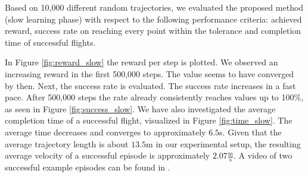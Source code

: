 \label{results}
Based on 10,000 different random trajectories, we evaluated the proposed method (slow learning phase) with respect to the following performance criteria: achieved reward, success rate on reaching every point within the tolerance and completion time of successful flights.

In Figure \ref{fig:reward_slow} the reward per step is plotted. We observed an increasing reward in the first 500,000 steps. The value seems to have converged by then.
Next, the success rate is evaluated. The success rate increases in a fast pace. After 500,000 steps the rate already consistently reaches values up to 100\%, as seen in Figure \ref{fig:success_slow}.
We have also investigated the average completion time of a successful flight, visualized in Figure \ref{fig:time_slow}. The average time decreases and converges to approximately $6.5$s. Given that the average trajectory length is about $13.5$m in our experimental setup, the resulting average velocity of a successful episode is approximately $2.07\frac{\text{m}}{\text{s}}$. A video of two successful example episodes can be found in \cite{slow_flight}.